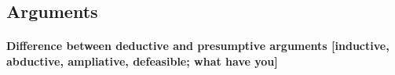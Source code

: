 \documentclass[10pt]{article}
\begin{document}
\begin{comment}
Suppose a witness asserts that $F$ in a court of law, denoted by $A_F$. We are now interested in knowing the 
strength of the evidence $A_F$. This depends on specifying the hypothesis of interest.  
Suppose the hypothesis is that F occurred and the witness did not misremember
nor misperceive, that is, $F\wedge C_F$. The alternative 
hypothesis will be that  F did not occur and the witness did misperceive nor misremember, 
that is, $\neg F \wedge \neg C_F$. The likelihood ratio 
of interest is therefore as follows:
%
\[\frac{P(A_F| F, C_F)}{P( A_F|\neg F, \neg C_F)}=\frac{P(A_F| C_F)}{P(A_F| \neg C_F)}\]
%
The equivalence is based on the idea that $A_F$ immediately depends on whether $C_F$ 
but not on whether $F$. We make assertions depending on our cognitive states, for examples, what we believe or not believe 
or whether we have an interest in lying. Whether a certain fact F occurred does not 
have a direct influence on our assertions (if not indirectly through 
our cognitive states). This, at least, is the assumptions 
about our psychology that justifies the equivalence above. 
\end{comment}

\begin{comment}

\paragraph{Mention the fiction of chains of independent evidence; perhaps postpone discussion to section on coherence}
		
\paragraph{References (Carnap, Skyrms, Fitelson, Schum, Kaye, Thompson)}
		

\paragraph{[The problem of the old evidence? The issue of evidential strength of a DNA match after a database search?]}

\end{comment}
\subsection{Arguments}

\paragraph{Difference between deductive and presumptive arguments [inductive, abductive, ampliative, defeasible; what have you]}
\end{document}
